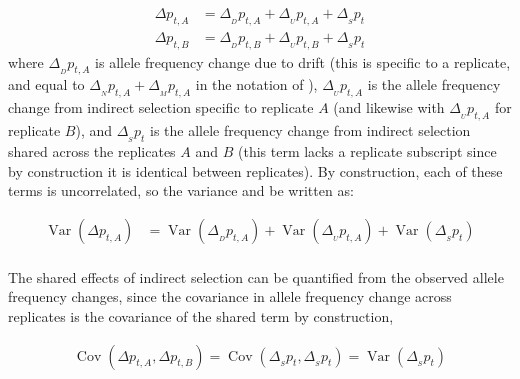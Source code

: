 \documentclass[11pt]{article}
\newcommand{\vb}[1]{{\it \color{blue} #1}}
\DeclareMathOperator{\var}{Var}
\DeclareMathOperator{\cov}{Cov}
\providecommand{\DIFdelbegin}{} %
\begin{document}
\begin{align}
  \Delta p_{t,A} &= \Delta_{_D} p_{t,A} + \Delta_{_{U}} p_{t,A} + \Delta_{_S} p_t \\
  \Delta p_{t,B} &= \Delta_{_D} p_{t,B} + \Delta_{_{U}} p_{t,B} + \Delta_{_S} p_t
\end{align}
%
where $\Delta_{_D} p_{t,A}$ is allele frequency change due to drift (this is
specific to a replicate, and equal to $\Delta_{_N} p_{t,A} + \Delta_{_M}
p_{t,A}$ in the notation of \cite{Buffalo2019-io}), $\Delta_{_{U}} p_{t,A}$ is
the allele frequency change from indirect selection specific to replicate $A$
(and likewise with $\Delta_{_{U}} p_{t,A}$ for replicate $B$), and $\Delta_{_S}
p_t$ is the allele frequency change from indirect selection shared across the
replicates $A$ and $B$ (this term lacks a replicate subscript since by
construction it is identical between replicates). By construction, each of
these terms is uncorrelated, so the variance and be written as:

\begin{align}
  \var(\Delta p_{t,A}) &= \var(\Delta_{_D} p_{t,A}) + \var(\Delta_{_{U}} p_{t,A}) + \var(\Delta_{_S} p_t) \\
\end{align}

The shared effects of indirect selection can be quantified from the observed
allele frequency changes, since the covariance in allele frequency change
across replicates is the covariance of the shared term by construction, 

\begin{align}
  \cov(\Delta p_{t,A}, \Delta p_{t,B}) = \cov(\Delta_{_S} p_{t}, \Delta_{_S} p_{t}) = \var(\Delta_{_S} p_{t})
\end{align}

\DIFdelbegin %

\end{document}

